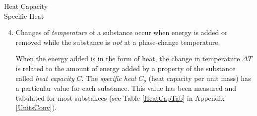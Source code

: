 \noindent
\begin{minipage}[c]{\leftcolumn}
	\baselineskip
	Heat Capacity\\
	Specific Heat
\end{minipage}
\begin{minipage}[c]{\rightcolumn}
	\begin{enumerate}\setcounter{enumi}{3}
		\item Changes of {\em temperature} of a substance occur when energy is added or removed while the substance is \emph{not} at a phase-change temperature.

		When the energy added is in the form of heat, the change in temperature $\Delta T$ is related to the amount of energy added by a property of the substance called \emph{heat capacity} $C$. The \emph{specific heat} $C_p$ (heat capacity per unit mass) has a particular value for each substance. This value has been measured and tabulated for most substances (see Table \ref{HeatCapTab} in Appendix \ref{UnitsConv}).
	\end{enumerate}
\end{minipage}